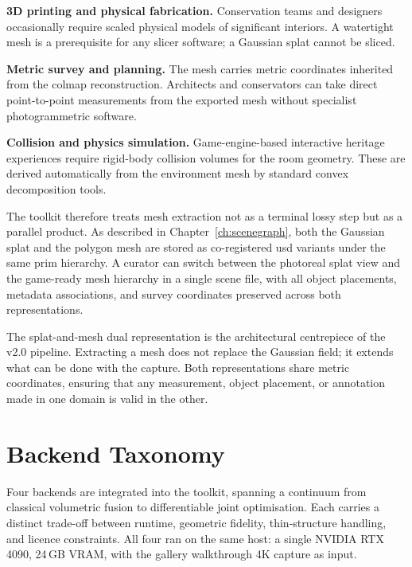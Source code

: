 \textbf{3D printing and physical fabrication.} Conservation teams and designers occasionally require scaled physical models of significant interiors. A watertight mesh is a prerequisite for any slicer software; a Gaussian splat cannot be sliced.

\textbf{Metric survey and planning.} The mesh carries metric coordinates inherited from the \acrshort{colmap} reconstruction. Architects and conservators can take direct point-to-point measurements from the exported mesh without specialist photogrammetric software.

\textbf{Collision and physics simulation.} Game-engine-based interactive heritage experiences require rigid-body collision volumes for the room geometry. These are derived automatically from the environment mesh by standard convex decomposition tools.

The toolkit therefore treats mesh extraction not as a terminal lossy step but as a parallel product. As described in Chapter~\ref{ch:scenegraph}, both the Gaussian splat and the polygon mesh are stored as co-registered \acrshort{usd} variants under the same prim hierarchy. A curator can switch between the photoreal splat view and the game-ready mesh hierarchy in a single scene file, with all object placements, metadata associations, and survey coordinates preserved across both representations.

\begin{keyfinding}
  The splat-and-mesh dual representation is the architectural centrepiece of the v2.0 pipeline. Extracting a mesh does not replace the Gaussian field; it extends what can be done with the capture. Both representations share metric coordinates, ensuring that any measurement, object placement, or annotation made in one domain is valid in the other.
\end{keyfinding}

\section{Backend Taxonomy}
\label{sec:backend-taxonomy}

Four backends are integrated into the toolkit, spanning a continuum from classical volumetric fusion to differentiable joint optimisation. Each carries a distinct trade-off between runtime, geometric fidelity, thin-structure handling, and licence constraints. All four ran on the same host: a single NVIDIA RTX 4090, 24\,GB VRAM, with the gallery walkthrough 4K capture as input.

